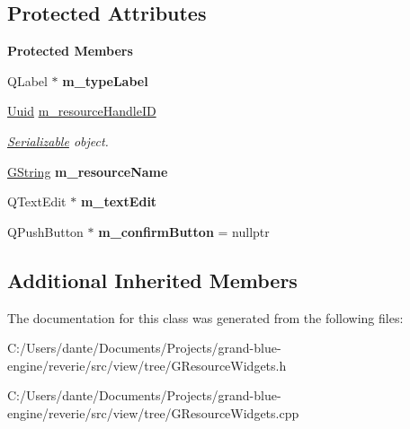 \subsection*{Protected Attributes}
\begin{Indent}\textbf{ Protected Members}\par
\begin{DoxyCompactItemize}
\item 
\mbox{\label{classrev_1_1_view_1_1_resource_json_widget_aba199dc728974fc2631980a13ef1b3cf}} 
Q\+Label $\ast$ {\bfseries m\+\_\+type\+Label}
\item 
\mbox{\label{classrev_1_1_view_1_1_resource_json_widget_ae8a33cb9a01a05cc37788f155312dce4}} 
\mbox{\hyperlink{classrev_1_1_uuid}{Uuid}} \mbox{\hyperlink{classrev_1_1_view_1_1_resource_json_widget_ae8a33cb9a01a05cc37788f155312dce4}{m\+\_\+resource\+Handle\+ID}}
\begin{DoxyCompactList}\small\item\em \mbox{\hyperlink{classrev_1_1_serializable}{Serializable}} object. \end{DoxyCompactList}\item 
\mbox{\label{classrev_1_1_view_1_1_resource_json_widget_a248e5f537ca39fb8e06b0f016fad904c}} 
\mbox{\hyperlink{classrev_1_1_g_string}{G\+String}} {\bfseries m\+\_\+resource\+Name}
\item 
\mbox{\label{classrev_1_1_view_1_1_resource_json_widget_af9b80b69d5fb0919d894a793272fe1a3}} 
Q\+Text\+Edit $\ast$ {\bfseries m\+\_\+text\+Edit}
\item 
\mbox{\label{classrev_1_1_view_1_1_resource_json_widget_a5fdcd5d442b51918fc3290a90161e214}} 
Q\+Push\+Button $\ast$ {\bfseries m\+\_\+confirm\+Button} = nullptr
\end{DoxyCompactItemize}
\end{Indent}
\subsection*{Additional Inherited Members}


The documentation for this class was generated from the following files\+:\begin{DoxyCompactItemize}
\item 
C\+:/\+Users/dante/\+Documents/\+Projects/grand-\/blue-\/engine/reverie/src/view/tree/G\+Resource\+Widgets.\+h\item 
C\+:/\+Users/dante/\+Documents/\+Projects/grand-\/blue-\/engine/reverie/src/view/tree/G\+Resource\+Widgets.\+cpp\end{DoxyCompactItemize}
